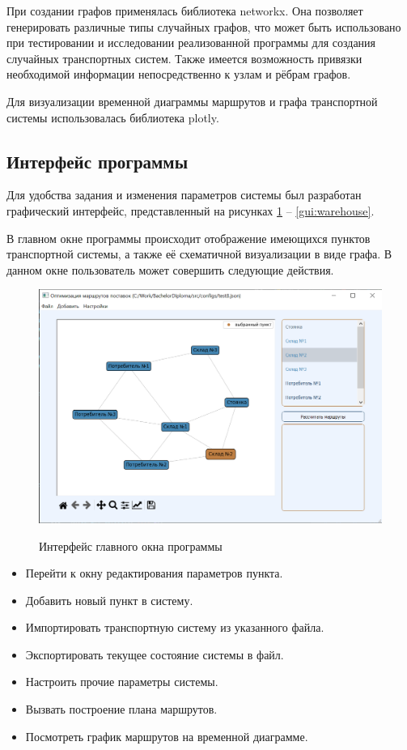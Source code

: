При создании графов применялась библиотека networkx. Она позволяет генерировать различные типы случайных графов, что может быть использовано при тестировании и исследовании реализованной программы для создания случайных транспортных систем. Также имеется возможность привязки необходимой информации непосредственно к узлам и рёбрам графов.

Для визуализации временной диаграммы маршрутов и графа транспортной системы использовалась библиотека plotly\cite{libs:plotly}.

\subsection{Интерфейс программы}
Для удобства задания и изменения параметров системы был разработан графический интерфейс, представленный на рисунках \ref{gui:main} -- \ref{gui:warehouse}.

В главном окне программы происходит отображение имеющихся пунктов транспортной системы, а также её схематичной визуализации в виде графа. В данном окне пользователь может совершить следующие действия.

\begin{figure}[hp]
	\begin{center}
		{\includegraphics[scale=0.75, angle=0, page=1]{img/main_page.png}}
		\caption{Интерфейс главного окна программы}
		\label{gui:main}
	\end{center}
\end{figure}

\begin{itemize}
	\item Перейти к окну редактирования параметров пункта.
	\item Добавить новый пункт в систему.
	\item Импортировать транспортную систему из указанного файла.
	\item Экспортировать текущее состояние системы в файл.
	\item Настроить прочие параметры системы.
	\item Вызвать построение плана маршрутов.
	\item Посмотреть график маршрутов на временной диаграмме.
\end{itemize}

